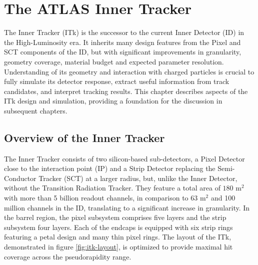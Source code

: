 
\chapter{The ATLAS Inner Tracker}
\label{chap:itk}
The Inner Tracker (ITk) is the successor to the current Inner Detector (ID) in the High-Luminosity era.
It inherits many design features from the Pixel and SCT components of the ID, but with significant improvements in granularity, 
geometry coverage, material budget and expected parameter resolution. 
Understanding of its geometry and interaction with charged particles is crucial to fully simulate its detector response, 
extract useful information from track candidates, and interpret tracking results.
This chapter describes aspects of the ITk design and simulation, providing a foundation for the discussion in subsequent chapters. 

\section{Overview of the Inner Tracker}
\label{sect:itk-overview}

The Inner Tracker consists of two silicon-based sub-detectors, a Pixel Detector close to the interaction point (IP) and a Strip Detector replacing the Semi-Conductor Tracker (SCT) at a larger radius, 
but, unlike the Inner Detector, without the Transition Radiation Tracker. 
They feature a total area of $180$ $\mathrm{m}^2$ with more than 5 billion readout channels, 
in comparison to $63$ $\mathrm{m}^2$ and 100 million channels in the ID, translating to a significant increase in granularity. 
In the barrel region, the pixel subsystem comprises five layers and the strip subsystem four layers.
Each of the endcaps is equipped with six strip rings featuring a petal design and many thin pixel rings. 
The layout of the ITk, demonstrated in figure \ref{fig:itk-layout}, is optimized to provide maximal hit coverage across the pseudorapidity range. 

